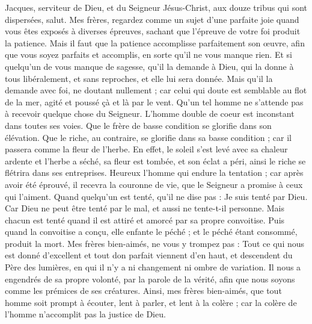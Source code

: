 \begin{multicols}{2}
\TextTitle{[Introduction]}
\VerseOne{}Jacques, serviteur de Dieu, et du Seigneur Jésus-Christ, aux douze tribus qui sont dispersées, salut.
Mes frères, regardez comme un sujet d'une parfaite joie quand vous êtes exposés à diverses épreuves,
sachant que l'épreuve de votre foi produit la patience.
Mais il faut que la patience accomplisse parfaitement son œuvre, afin que vous soyez parfaits et accomplis, en sorte qu’il ne vous manque rien.
Et si quelqu'un de vous manque de sagesse, qu'il la demande à Dieu, qui la donne à tous libéralement, et sans reproches, et elle lui sera donnée.
Mais qu'il la demande avec foi, ne doutant nullement ; car celui qui doute est semblable au flot de la mer, agité et poussé çà et là par le vent.
Qu’un tel homme ne s'attende pas à recevoir quelque chose du Seigneur.
L'homme double de coeur est inconstant dans toutes ses voies.
Que le frère de basse condition se glorifie dans son élévation.
Que le riche, au contraire, se glorifie dans sa basse condition ; car il passera comme la fleur de l'herbe.
En effet, le soleil s'est levé avec sa chaleur ardente et l'herbe a séché, sa fleur est tombée, et son éclat a péri, ainsi le riche se flétrira dans ses entreprises.
Heureux l'homme qui endure la tentation{} ; car après avoir été éprouvé, il recevra la couronne de vie, que le Seigneur a promise à ceux qui l'aiment.
Quand quelqu'un est tenté, qu'il ne dise pas : Je suis tenté par Dieu. Car Dieu ne peut être tenté par le mal, et aussi ne tente-t-il personne.
Mais chacun est tenté quand il est attiré et amorcé par sa propre convoitise.
Puis quand la convoitise a conçu, elle enfante le péché ; et le péché étant consommé, produit la mort.
Mes frères bien-aimés, ne vous y trompez pas :
Tout ce qui nous est donné d'excellent et tout don parfait viennent d'en haut, et descendent du Père des lumières, en qui il n'y a ni changement ni ombre de variation.
Il nous a engendrés de sa propre volonté, par la parole de la vérité, afin que nous soyons comme les prémices de ses créatures.
Ainsi, mes frères bien-aimés, que tout homme soit prompt à écouter, lent à parler, et lent à la colère ;
car la colère de l'homme n'accomplit pas la justice de Dieu.

\end{multicols}
